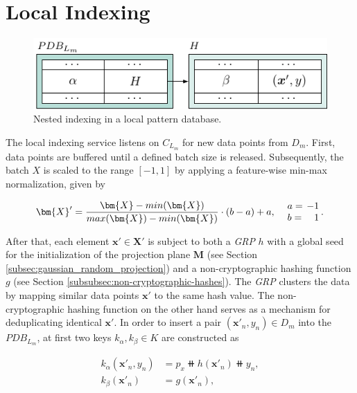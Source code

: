 \section{Local Indexing} \label{sec:local_indexing}

\begin{figure}[b]
    \centering
    \includegraphics[width=1\linewidth]{tikz/indexing.pdf}
    \caption{Nested indexing in a local pattern database.}
    \label{fig:indexing}
\end{figure}

The local indexing service listens on $C_{L_m}$ for new data points from $D_m$. First, data points are buffered until a defined batch size is released. Subsequently, the batch $X$ is scaled to the range $[-1, 1]$ by applying a feature-wise min-max normalization, given by

\begin{align*}
    \bm{X}' = \frac{\bm{X}-min(\bm{X})}{max(\bm{X}) - min(\bm{X})} \cdot (b - a) + a, \quad
    \setlength\arraycolsep{2pt}
    \begin{array}{lr}
        a = &-1 \\
        b = & 1    
    \end{array}.
\end{align*}

After that, each element $\bm{x}' \in \bm{X}'$ is subject to both a \textit{GRP} $h$ with a global seed for the initialization of the projection plane $\bm{M}$ (see Section \ref{subsec:gaussian_random_projection}) and a non-cryptographic hashing function $g$ (see Section \ref{subsubsec:non-cryptographic-hashes}). The \textit{GRP} clusters the data by mapping similar data points $\bm{x}'$ to the same hash value. The non-cryptographic hashing function on the other hand serves as a mechanism for deduplicating identical $\bm{x}'$. In order to insert a pair $(\bm{x}'_n, y_n) \in D_m$ into the $PDB_{L_m}$, at first two keys $k_\alpha, k_\beta \in K$ are constructed as

\begin{align*}
    k_\alpha(\bm{x}'_n, y_n) &= p_x \doubleplus h(\bm{x}'_n) \doubleplus y_n,\\
    k_\beta(\bm{x}'_n) &= g(\bm{x}'_n),
\end{align*}

